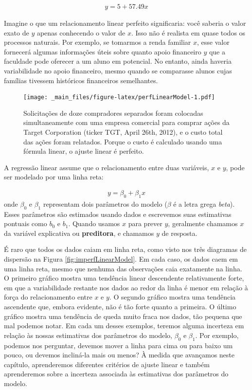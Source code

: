 \documentclass[
]{book}
\theoremstyle{definition}
\theoremstyle{definition}
\theoremstyle{definition}
\theoremstyle{definition}
\theoremstyle{remark}
\begin{document}
\begin{eqnarray*}
y = 5 + 57.49x
\end{eqnarray*}

Imagine o que um relacionamento linear perfeito significaria: você saberia o valor exato de \(y\) apenas conhecendo o valor de \(x\). Isso não é realista em quase todos os processos naturais. Por exemplo, se tomarmos a renda familiar \(x\), esse valor fornecerá algumas informações úteis sobre quanto apoio financeiro \(y\) que a faculdade pode oferecer a um aluno em potencial. No entanto, ainda haveria variabilidade no apoio financeiro, mesmo quando se comparasse alunos cujas famílias tivessem históricos financeiros semelhantes.

\begin{figure}
\centering
\texttt{[image: \_main\_files/figure-latex/perfLinearModel-1.pdf]}
\caption{\label{fig:perfLinearModel}Solicitações de doze compradores separados foram colocadas simultaneamente com uma empresa comercial para comprar ações da Target Corporation (ticker TGT, April 26th, 2012), e o custo total das ações foram relatados. Porque o custo é calculado usando uma fórmula linear, o ajuste linear é perfeito.}
\end{figure}

A regressão linear assume que o relacionamento entre duas variáveis, \(x\) e \(y\), pode ser modelado por uma linha reta:

\begin{eqnarray}
y = \beta_0 + \beta_1x
\label{eq:genLinModelWNoErrorTerm}
\end{eqnarray}
onde \(\beta_0\) e \(\beta_1\) representam dois parâmetros do modelo (\(\beta\) é a letra grega \emph{beta}). Esses parâmetros são estimados usando dados e escrevemos suas estimativas pontuais como \(b_0\) e \(b_1\). Quando usamos \(x\) para prever \(y\), geralmente chamamos \(x\) da variável explicativa ou \textbf{preditora}, e chamamos \(y\) de resposta.

É raro que todos os dados caiam em linha reta, como visto nos três diagramas de dispersão na Figura \ref{fig:imperfLinearModel}. Em cada caso, os dados caem em uma linha reta, mesmo que nenhuma das observações caia exatamente na linha. O primeiro gráfico mostra uma tendência linear descendente relativamente forte, em que a variabilidade restante nos dados ao redor da linha é menor em relação à força do relacionamento entre \(x\) e \(y\). O segundo gráfico mostra uma tendência ascendente que, embora evidente, não é tão forte quanto a primeira. O último gráfico mostra uma tendência de queda muito fraca nos dados, tão pequena que mal podemos notar. Em cada um desses exemplos, teremos alguma incerteza em relação às nossas estimativas dos parâmetros do modelo, \(\beta_0\) e \(\beta_1\). Por exemplo, podemos nos perguntar, devemos mover a linha para cima ou para baixo um pouco, ou devemos incliná-la mais ou menos? À medida que avançamos neste capítulo, aprenderemos diferentes critérios de ajuste linear e também aprenderemos sobre a incerteza associada às estimativas dos parâmetros do modelo.
\end{document}
